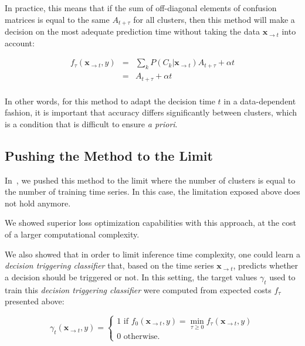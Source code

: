 In practice, this means that if the sum of off-diagonal elements of confusion
matrices is equal to the same $A_{t+\tau}$ for all clusters, then this method
will make a decision on the most adequate prediction time without taking the
data $\mathbf{x}_{\rightarrow t}$ into account:

\begin{eqnarray}
    f_\tau(\mathbf{x}_{\rightarrow t}, y) &=&
        \sum_k P(C_k | \mathbf{x}_{\rightarrow t})
        A_{t+\tau}
        + \alpha t \\
     &=&
        A_{t+\tau} + \alpha t \\
\end{eqnarray}

In other words, for this method to adapt the decision time $t$ in a
data-dependent fashion, it is important that accuracy differs
significantly between clusters, which is a condition that is difficult to ensure
\emph{a priori}.

\subsection{Pushing the Method to the Limit}

In~\cite{tavenard:halshs-01339007}, we pushed this method to the limit
where the number of clusters is equal to the number of training time series.
In this case, the limitation exposed above does not hold anymore.

We showed superior loss optimization capabilities with this approach, at the
cost of a larger computational complexity.

We also showed that in order to limit inference time complexity, one could
learn a \emph{decision triggering classifier} that, based on the time series
$\mathbf{x}_{\rightarrow t}$, predicts whether a decision should be triggered
or not.
In this setting, the target values $\gamma_t$ used to train this
\emph{decision triggering classifier}
were computed from expected costs $f_\tau$ presented above:

\begin{equation}
    \gamma_t(\mathbf{x}_{\rightarrow t}, y) = \left\{
        \begin{array}{l}
            1 \text{ if } f_{0}(\mathbf{x}_{\rightarrow t}, y) =
                \min_{\tau \geq 0} f_{\tau}(\mathbf{x}_{\rightarrow t}, y) \\
            0 \text{ otherwise. }
        \end{array} \right.
\end{equation}

